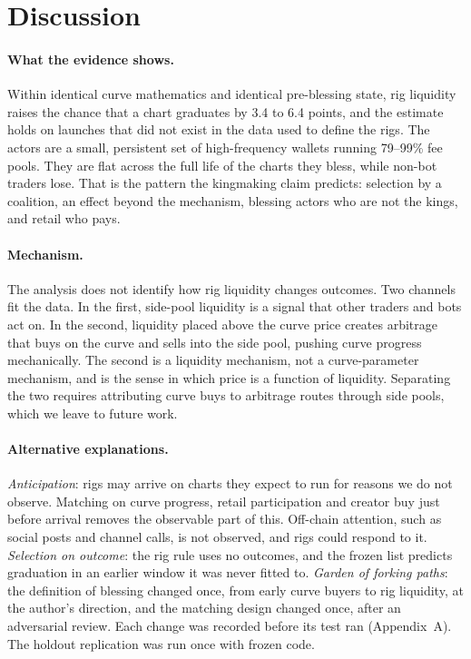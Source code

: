 \documentclass{ledger}
\begin{document}
\section{Discussion}\label{discussion}

\paragraph{What the evidence shows.} Within identical curve mathematics and identical pre-blessing state, rig liquidity raises the chance that a chart graduates by 3.4 to 6.4 points, and the estimate holds on launches that did not exist in the data used to define the rigs. The actors are a small, persistent set of high-frequency wallets running 79--99\% fee pools. They are flat across the full life of the charts they bless, while non-bot traders lose. That is the pattern the kingmaking claim predicts: selection by a coalition, an effect beyond the mechanism, blessing actors who are not the kings, and retail who pays.

\paragraph{Mechanism.} The analysis does not identify how rig liquidity changes outcomes. Two channels fit the data. In the first, side-pool liquidity is a signal that other traders and bots act on. In the second, liquidity placed above the curve price creates arbitrage that buys on the curve and sells into the side pool, pushing curve progress mechanically. The second is a liquidity mechanism, not a curve-parameter mechanism, and is the sense in which price is a function of liquidity. Separating the two requires attributing curve buys to arbitrage routes through side pools, which we leave to future work.

\paragraph{Alternative explanations.} \emph{Anticipation}: rigs may arrive on charts they expect to run for reasons we do not observe. Matching on curve progress, retail participation and creator buy just before arrival removes the observable part of this. Off-chain attention, such as social posts and channel calls, is not observed, and rigs could respond to it. \emph{Selection on outcome}: the rig rule uses no outcomes, and the frozen list predicts graduation in an earlier window it was never fitted to. \emph{Garden of forking paths}: the definition of blessing changed once, from early curve buyers to rig liquidity, at the author's direction, and the matching design changed once, after an adversarial review. Each change was recorded before its test ran (Appendix~A). The holdout replication was run once with frozen code.
\end{document}
